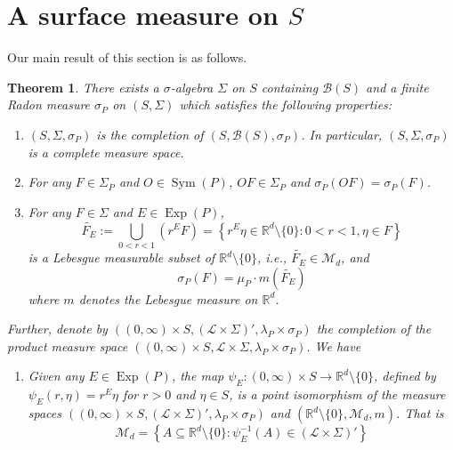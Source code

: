 \documentclass[11pt, letter]{book}
\newtheorem{theorem}{Theorem}[section]
\newcommand\Sym{\operatorname{Sym}}
\newcommand\Exp{\operatorname{Exp}}
\begin{document}
\section{A surface measure on $S$}
Our main result of this section is as follows. 
\begin{framed}
\begin{theorem}\label{thm:BestIntegrationFormula}
There exists a $\sigma$-algebra $\Sigma$ on $S$ containing $\mathcal{B}(S)$ and a finite Radon measure $\sigma_P$ on $(S,\Sigma)$ which satisfies the following properties:
\begin{enumerate}
\item\label{property:Completion} $(S,\Sigma,\sigma_P)$ is the completion of $(S,\mathcal{B}(S),\sigma_P)$. In particular, $(S,\Sigma,\sigma_P)$ is a complete measure space.
\item\label{property:Invariance} For any $F\in\Sigma_P$ and $O\in\Sym(P)$, $OF\in\Sigma_P$ and $\sigma_P(OF)=\sigma_P(F)$.
\item\label{property:DefiningConditionofsigma} For any $F\in\Sigma$ and $E\in\Exp(P)$, 
\begin{equation*}
\widetilde{F_E}:=\bigcup_{0<r<1}\left(r^E F\right)=\left\{r^E\eta\in\mathbb{R}^d\setminus\{0\}:0<r<1,\eta\in F\right\}
\end{equation*}
is a Lebesgue measurable subset of $\mathbb{R}^d\setminus \{0\}$, i.e., $\widetilde{F_E}\in\mathcal{M}_d$, and
\begin{equation*}
\sigma_P(F)=\mu_P\cdot m\left(\widetilde{F_E}\right)
\end{equation*}
where $m$ denotes the Lebesgue measure on $\mathbb{R}^d$.
\end{enumerate}
Further, denote by $\left((0,\infty)\times S,(\mathcal{L}\times\Sigma)',\lambda_P\times\sigma_P\right)$ the completion of the product measure space $((0,\infty) \times S,\mathcal{L}\times\Sigma,\lambda_P\times\sigma_P)$. We have
\begin{enumerate}
\item\label{property:BestPointIsomorphism} Given any $E\in \Exp(P)$, the map $\psi_E:(0,\infty)\times S\to\mathbb{R}^d\setminus\{0\}$, defined by $\psi_E(r,\eta)=r^E\eta$ for $r>0$ and $\eta\in S$, is a point isomorphism of the measure spaces $\left((0,\infty)\times S,(\mathcal{L}\times\Sigma)',\lambda_P\times\sigma_P\right)$ and $(\mathbb{R}^d\setminus\{0\},\mathcal{M}_d,m)$. That is
\begin{equation*}
\mathcal{M}_d=\left\{A\subseteq \mathbb{R}^d\setminus\{0\}:\psi_E^{-1}(A)\in (\mathcal{L}\times\Sigma)'\right\}

\end{equation*}
\end{enumerate}
\end{theorem}
\end{framed}
\end{document}
